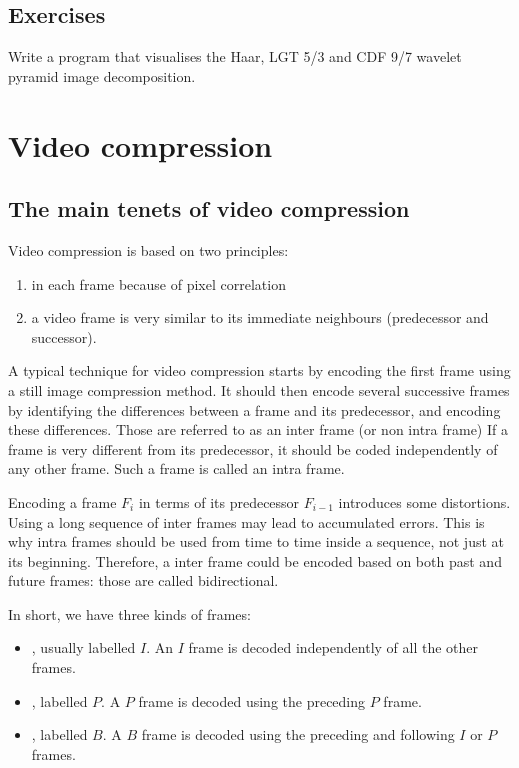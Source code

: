 \documentclass[a4paper, 11pt, openany]{book}
\begin{document}
\subsection{Exercises}

\begin{exercise}
Write a program that visualises the Haar, LGT 5/3 and CDF 9/7 wavelet pyramid image decomposition.
\end{exercise}






\section{Video compression}
\label{sec:10}


\subsection{The main tenets of video compression}


Video compression is based on two principles:
\begin{enumerate}
    \item {} in each frame because of pixel correlation

    \item {} a video frame is very similar to its immediate neighbours (predecessor and successor).
\end{enumerate}

A typical technique for video compression starts by encoding the first frame using a still image compression method. It should then encode several successive frames by identifying the differences between a frame and
its predecessor, and encoding these differences. Those are referred to as an inter frame (or non intra frame) If a frame is very different from its predecessor, it should be coded independently of any other frame. Such a frame is called an intra frame.

Encoding a frame $F_i$ in terms of its predecessor
$F_{i-1}$ introduces some distortions. Using a long sequence of inter frames may lead to accumulated errors. This
is why intra frames should be used from time to time inside a sequence, not just at its
beginning. Therefore, a inter frame could be encoded based on both past and future frames: those are called bidirectional.

In short, we have three kinds of frames:
\begin{itemize}
    \item {}, usually labelled $I$. An $I$ frame is decoded independently of all the other frames.

    \item {}, labelled $P$. A $P$ frame is decoded using the preceding $P$ frame.

    \item {}, labelled $B$. A $B$ frame is decoded using the preceding and following $I$ or $P$ frames.
\end{itemize}
\end{document}
